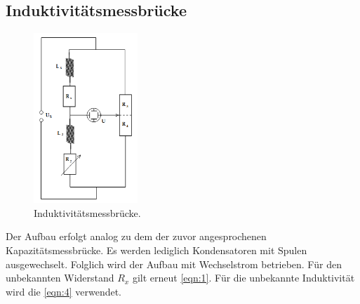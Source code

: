 \subsection{Induktivitätsmessbrücke}
\begin{figure}[H]
    \centering
        \centering
        \includegraphics[width=0.35\textwidth]{Bilder/induktivitaetsmess.png}
        \caption{Induktivitätsmessbrücke. \cite{anleitung}}
    \hfill
    \label{fig:f4}
\end{figure}
\noindent Der Aufbau erfolgt analog zu dem der zuvor angesprochenen 
Kapazitätsmessbrücke. Es werden lediglich Kondensatoren mit Spulen ausgewechselt.
Folglich wird der Aufbau mit Wechselstrom betrieben. Für den unbekannten
Widerstand $R_x$ gilt erneut \autoref{eqn:1}. Für die unbekannte Induktivität 
wird die \autoref{eqn:4} verwendet.

